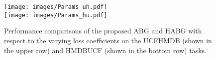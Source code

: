 \begin{figure}[t]
    \centering
    \texttt{[image: images/Params\_uh.pdf]}\\
    \texttt{[image: images/Params\_hu.pdf]}
    \caption{Performance comparisons of the proposed ABG and HABG with respect to the varying loss coefficients on the UCFHMDB (shown in the upper row) and HMDBUCF (shown in the bottom row) tasks.}
    \label{fig:params}
\end{figure}
